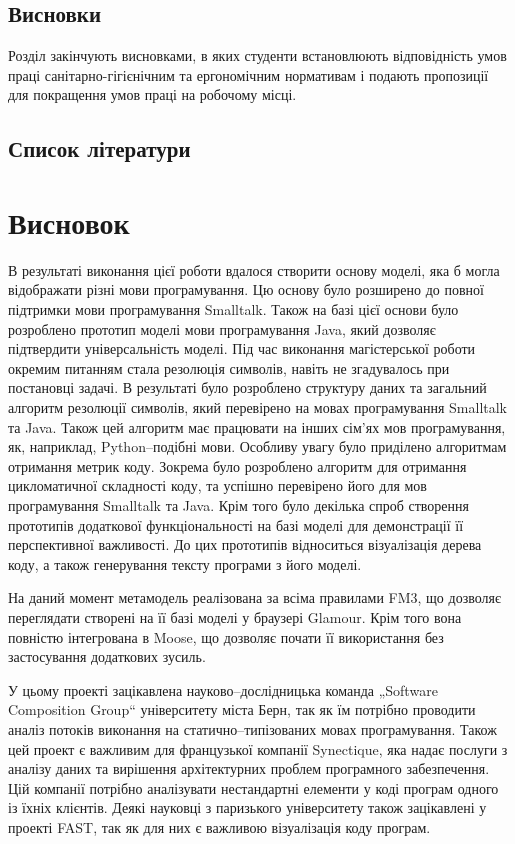 \documentclass[12pt,a4paper]{article}
\begin{document}
\subsection{Висновки}
Розділ закінчують висновками, в яких студенти встановлюють відповідність умов праці санітарно-гігієнічним та ергономічним нормативам і подають пропозиції для покращення умов праці на робочому місці. 


\subsection{Список літератури}

\clearpage

\section{Висновок}
В результаті виконання цієї роботи вдалося створити основу моделі, яка б могла відображати різні мови програмування. Цю основу було розширено до повної підтримки мови програмування Smalltalk. Також на базі цієї основи було розроблено прототип моделі мови програмування Java, який дозволяє підтвердити універсальність моделі. Під час виконання магістерської роботи окремим питанням стала резолюція символів, навіть не згадувалось при постановці задачі. В результаті було розроблено структуру даних та загальний алгоритм резолюції символів, який перевірено на мовах програмування Smalltalk та Java. Також цей алгоритм має працювати на інших сім'ях мов програмування, як, наприклад, Python--подібні мови. Особливу увагу було приділено алгоритмам отримання метрик коду. Зокрема було розроблено алгоритм для отримання цикломатичної складності коду, та успішно перевірено його для мов програмування Smalltalk та Java. Крім того було декілька спроб створення прототипів додаткової функціональності на базі моделі для демонстрації її перспективної важливості. До цих прототипів відноситься візуалізація дерева коду, а також генерування тексту програми з його моделі.

На даний момент метамодель реалізована за всіма правилами FM3, що дозволяє переглядати створені на її базі моделі у браузері Glamour. Крім того вона повністю інтегрована в Moose, що дозволяє почати її використання без застосування додаткових зусиль.

У цьому проекті зацікавлена науково--дослідницька команда „Software Composition Group“ університету міста Берн, так як їм потрібно проводити аналіз потоків виконання на статично--типізованих мовах програмування. Також цей проект є важливим для французької компанії Synectique, яка надає послуги з аналізу даних та вирішення архітектурних проблем програмного забезпечення. Цій компанії потрібно аналізувати нестандартні елементи у коді програм одного із їхніх клієнтів. Деякі науковці з паризького університету також зацікавлені у проекті FAST, так як для них є важливою візуалізація коду програм.
\end{document}
